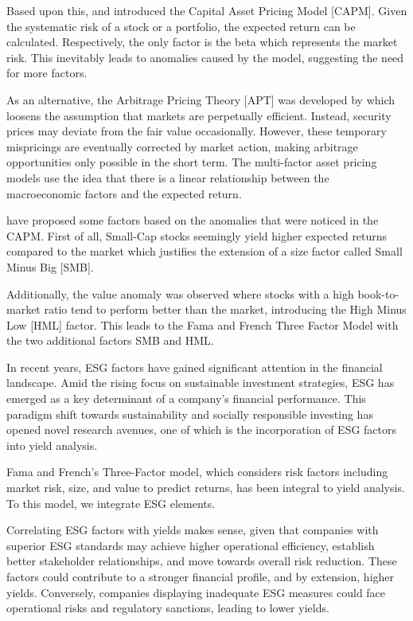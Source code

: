 \documentclass[12pt, a4paper]{article}%
\begin{document}
Based upon this, \textcite{Sharpe1964} and \textcite{Lintner1965} introduced the Capital Asset Pricing Model [CAPM]. Given the systematic risk of a stock or a portfolio, the expected return can be calculated. Respectively, the only factor is the beta which represents the market risk. This inevitably leads to anomalies caused by the model, suggesting the need for more factors.

As an alternative, the Arbitrage Pricing Theory [APT] was developed by \textcite{Ross1976} which loosens the assumption that markets are perpetually efficient. Instead, security prices may deviate from the fair value occasionally. However, these temporary mispricings are eventually corrected by market action, making arbitrage opportunities only possible in the short term.
The multi-factor asset pricing models use the idea that there is a linear relationship between the macroeconomic factors and the expected return.

\textcite{FamaFrench1992} have proposed some factors based on the anomalies that were noticed in the CAPM.
First of all, Small-Cap stocks seemingly yield higher expected returns compared to the market which justifies the extension of a size factor called Small Minus Big [SMB].

Additionally, the value anomaly was observed where stocks with a high book-to-market ratio tend to perform better than the market, introducing the High Minus Low [HML] factor.
This leads to the Fama and French Three Factor Model with the two additional factors SMB and HML.

In recent years, ESG factors have gained significant attention in the financial landscape. Amid the rising focus on sustainable investment strategies, ESG has emerged as a key determinant of a company’s financial performance. This paradigm shift towards sustainability and socially responsible investing has opened novel research avenues, one of which is the incorporation of ESG factors into yield analysis.

Fama and French's Three-Factor model, which considers risk factors including market risk, size, and value to predict returns, has been integral to yield analysis. To this model, we integrate ESG elements.

Correlating ESG factors with yields makes sense, given that companies with superior ESG standards may achieve higher operational efficiency, establish better stakeholder relationships, and move towards overall risk reduction. These factors could contribute to a stronger financial profile, and by extension, higher yields. Conversely, companies displaying inadequate ESG measures could face operational risks and regulatory sanctions, leading to lower yields.
\end{document}
